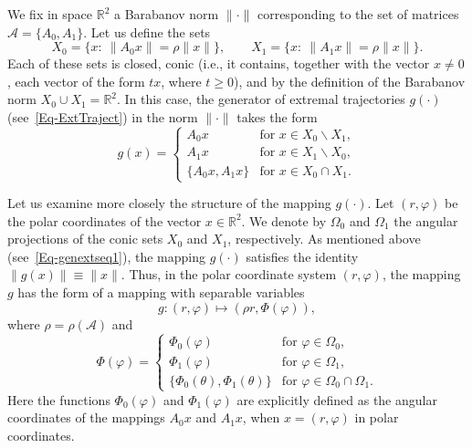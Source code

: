 \documentclass[a4paper,10pt,reqno]{amsart}
\newcommand{\setA}{\mathscr{A}}
\begin{document}
We fix in space $\mathbb{R}^{2}$ a Barabanov norm $\|\cdot\|$ corresponding
to the set of matrices $\setA=\{A_{0},A_{1}\}$. Let us define the sets
\begin{equation}\label{Eq-defX}
 X_{0}=\{x:~\|A_{0}x\|=\rho\|x\|\},\qquad X_{1}=\{x:~\|A_{1}x\|=\rho\|x\|\}.
\end{equation}
Each of these sets is closed, conic (i.e., it contains, together with the
vector $x\neq0$, each vector of the form $tx$, where $t\ge0$), and by the
definition of the Barabanov norm $X_{0}\cup X_{1}={\mathbb{R}}^{2}$. In this
case, the generator of extremal trajectories $g(\cdot)$
(see~\eqref{Eq-ExtTraject}) in the norm $\|\cdot\|$ takes the form
\begin{equation}\label{Eq-maxmap}
g(x)=\left\{\begin{array}{cl}
  A_{0}x & \textrm{for~}x\in X_{0}\backslash X_{1}, \\
  A_{1}x & \textrm{for~}x\in X_{1}\backslash X_{0},\\
  \{A_{0}x,A_{1}x\}& \textrm{for~}x\in X_{0}\cap X_{1}.
\end{array}  \right.
\end{equation}

Let us examine more closely the structure of the mapping $g(\cdot)$. Let
$(r,\varphi)$ be the polar coordinates of the vector $x\in\mathbb{R}^{2}$. We
denote by $\Omega_{0}$ and $\Omega_{1}$ the angular projections of the conic
sets $X_{0}$ and $X_{1}$, respectively. As mentioned above
(see~\eqref{Eq-genextseq1}), the mapping $g(\cdot)$ satisfies the identity
$\|g(x)\|\equiv \|x\|$. Thus, in the polar coordinate system $(r,\varphi)$,
the mapping $g$ has the form of a mapping with separable variables
\begin{equation}\label{Eq-maxmanlx}
g:(r,\varphi)\mapsto (\rho r,\varPhi(\varphi)),
\end{equation}
where $\rho=\rho(\setA)$ and
\begin{equation}\label{Eq-lxdef}
\varPhi(\varphi)=\left\{\begin{array}{cl}
  \varPhi_{0}(\varphi) & \textrm{for~}\varphi\in \Omega_{0},\\
  \varPhi_{1}(\varphi) & \textrm{for~}\varphi\in \Omega_{1},\\
  \{\varPhi_{0}(\theta),\varPhi_{1}(\theta)\} & \textrm{for~}\varphi\in
  \Omega_{0}\cap \Omega_{1}.
\end{array}  \right.
\end{equation}
Here the functions $\varPhi_{0}(\varphi)$ and $\varPhi_{1}(\varphi)$ are
explicitly defined as the angular coordinates of the mappings $A_{0}x$ and
$A_{1}x$, when $x= (r,\varphi)$ in polar coordinates.
\end{document}
